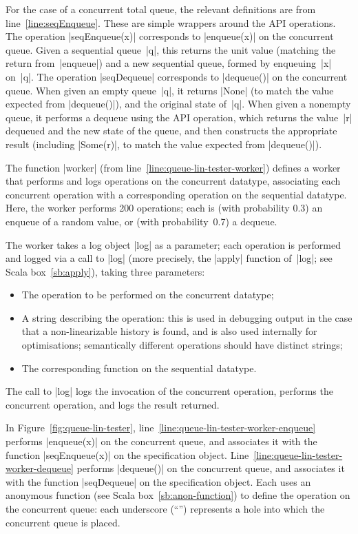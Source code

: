 For the case of a concurrent total queue, the relevant definitions are from
line~\ref{line:seqEnqueue}.  These are simple wrappers around the API
operations.  The operation |seqEnqueue(x)| corresponds to |enqueue(x)| on the
concurrent queue.  Given a sequential queue~|q|, this returns the unit value
(matching the return from~|enqueue|) and a new sequential queue, formed by
enqueuing~|x| on~|q|.  The operation |seqDequeue| corresponds to |dequeue()|
on the concurrent queue.  When given an empty queue~|q|, it returns |None| (to
match the value expected from |dequeue()|), and the original state of~|q|.
When given a nonempty queue, it performs a dequeue using the API
operation, which returns the value~|r| dequeued and the new state of the
queue, and then constructs the appropriate result (including |Some(r)|, to
match the value expected from |dequeue()|).


The function |worker| (from line~\ref{line:queue-lin-tester-worker}) defines
a worker that performs and logs operations on the concurrent datatype,
associating each concurrent operation with a corresponding operation on the
sequential datatype.  Here, the worker performs 200 operations; each is (with
probability 0.3) an enqueue of a random value, or (with probability~0.7) a
dequeue.


The worker takes a log object |log| as a parameter; each operation is
performed and logged via a call to |log| (more precisely, the |apply| function
of~|log|; see Scala box~\ref{sb:apply}), taking three parameters:
%
\begin{itemize}
\item
The operation to be performed on the concurrent datatype;

\item A string describing the operation: this is used in debugging output in
  the case that a non-linearizable history is found, and is also used
  internally for optimisations; semantically different operations should have
  distinct strings;

\item
The corresponding function on the sequential datatype.
\end{itemize}
%
The call to |log| logs the invocation of the concurrent operation,
performs the concurrent operation, and logs the result returned.

In Figure~\ref{fig:queue-lin-tester},
line~\ref{line:queue-lin-tester-worker-enqueue} performs |enqueue(x)| on the
concurrent queue, and associates it with the function |seqEnqueue(x)| on the
specification object.  Line~\ref{line:queue-lin-tester-worker-dequeue}
performs |dequeue()| on the concurrent queue, and associates it with the
function |seqDequeue| on the specification object.  Each uses an anonymous
function (see Scala box~\ref{sb:anon-function}) to define the operation on the
concurrent queue: each underscore (``\SCALA{_}'') represents a hole into which
the concurrent queue is placed.

